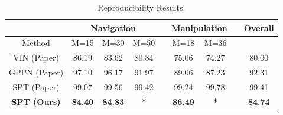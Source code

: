 \begin{table}
\begin{center}
\begin{tabular}{@{}ccccccccc@{}}
\toprule
                                  & \multicolumn{3}{c}{Navigation} &  & \multicolumn{2}{c}{Manipulation} &  & Overall \\ \midrule
Method                            & M=15     & M=30     & M=50     &  & M=18            & M=36           &  &         \\ \midrule
\multicolumn{1}{c|}{VIN (Paper)}  & 86.19    & 83.62    & 80.84    &  & 75.06           & 74.27          &  & 80.00   \\
\multicolumn{1}{c|}{GPPN (Paper)} & 97.10    & 96.17    & 91.97    &  & 89.06           & 87.23          &  & 92.31   \\
\multicolumn{1}{c|}{SPT (Paper)}  & 99.07    & 99.56    & 99.42    &  & 99.24           & 99.78          &  & 99.41   \\
\multicolumn{1}{c|}{\textbf{SPT (Ours)}}   & \textbf{84.40}    & \textbf{84.83}    &\textbf{ *  }      &  & \textbf{86.49}           & \textbf{*}              &  & \textbf{84.74}        \\ \bottomrule
\end{tabular}
\end{center}
\caption{Reproducibility Results.}
\end{table}

